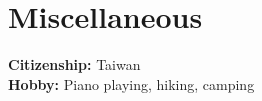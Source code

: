 \documentclass[A4,11pt]{article}
\makeatletter
\newcommand{\CVSubheading}[4]{
  \vspace{-2pt}\item
    \begin{tabular*}{0.97\textwidth}[t]{l@{\extracolsep{\fill}}r}
      \textbf{#1} & #2 \\
      \small#3 & \small #4 \\
    \end{tabular*}\vspace{-7pt}
}
\newcommand{\CVSubHeadingListStart}{\begin{itemize}[leftmargin=0.5cm, label={}]}
\newcommand{\CVSubHeadingListEnd}{\end{itemize}}
\makeatother
\begin{document}
\section{Miscellaneous}

\textbf{Citizenship:} Taiwan \\
\textbf{Hobby:} Piano playing, hiking, camping
  

    
\end{document}
